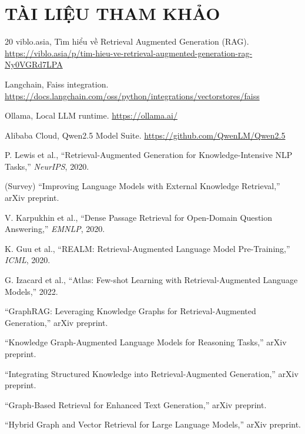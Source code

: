 \documentclass[10pt, conference, a4paper, compsocconf]{IEEEtran}
\begin{document}
\section{TÀI LIỆU THAM KHẢO}
\begin{thebibliography}{20}
  viblo.asia, Tìm hiểu về Retrieval Augmented Generation (RAG). \url{https://viblo.asia/p/tim-hieu-ve-retrieval-augmented-generation-rag-Ny0VGRd7LPA}

  Langchain, Faiss integration. \url{https://docs.langchain.com/oss/python/integrations/vectorstores/faiss}

  Ollama, Local LLM runtime. \url{https://ollama.ai/}

  Alibaba Cloud, Qwen2.5 Model Suite. \url{https://github.com/QwenLM/Qwen2.5}

  P. Lewis et al., ``Retrieval-Augmented Generation for Knowledge-Intensive NLP Tasks,'' \textit{NeurIPS}, 2020.

  (Survey) ``Improving Language Models with External Knowledge Retrieval,'' arXiv preprint.

  V. Karpukhin et al., ``Dense Passage Retrieval for Open-Domain Question Answering,'' \textit{EMNLP}, 2020.

  K. Guu et al., ``REALM: Retrieval-Augmented Language Model Pre-Training,'' \textit{ICML}, 2020.

  G. Izacard et al., ``Atlas: Few-shot Learning with Retrieval-Augmented Language Models,'' 2022.

  ``GraphRAG: Leveraging Knowledge Graphs for Retrieval-Augmented Generation,'' arXiv preprint.

  ``Knowledge Graph-Augmented Language Models for Reasoning Tasks,'' arXiv preprint.

  ``Integrating Structured Knowledge into Retrieval-Augmented Generation,'' arXiv preprint.

  ``Graph-Based Retrieval for Enhanced Text Generation,'' arXiv preprint.

  ``Hybrid Graph and Vector Retrieval for Large Language Models,'' arXiv preprint.
\end{thebibliography}
\end{document}
